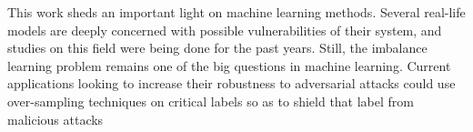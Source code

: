 This work sheds an important light on machine learning methods. Several real-life models are deeply concerned with possible vulnerabilities of their system, and studies on this field were being done for the past years. Still, the imbalance learning problem remains one of the big questions in machine learning. Current applications looking to increase their robustness to adversarial attacks could use over-sampling techniques on critical labels so as to shield that label from malicious attacks

